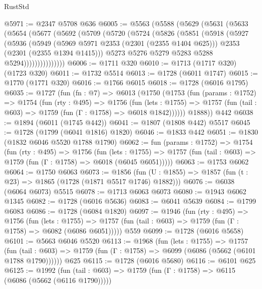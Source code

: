 \begin{lexlean}{RustStd}
\begin{coremodule}
@5971 := @2347 @5708 @636
@6005 := @5563
    (@5588
      (@5629
        (@5631
          (@5633
            (@5654
              (@5677
                (@5692
                  (@5709
                    (@5720
                      (@5724
                        (@5826
                          (@5851
                            (@5918
                              (@5927
                                (@5936
                                  (@5949
                                    (@5969 @5971 @2353 (@2301 (@2355 @1404 @625)))
                                    @2353
                                    (@2301 (@2355 @1394 @1415)))
                                  @5273
                                  @5276
                                  @5279
                                  @5283
                                  @5288
                                  @5294)))))))))))))))
@6006 := @1711 @320
@6010 := @1713 (@1717 @320) (@1723 @320)
@6011 := @1732 @5514
@6013 := @1728 (@6011 @1747)
@6015 := @1770 (@1771 @320)
@6016 := @1766 @6015
@6018 := @1728 (@6016 @1795)
@6035 := @1727
    (fun (fn : @7) =>
    @6013
      (@1750
        (@1753
          (fun (params : @1752) =>
          @1754
            (fun (rty : @495) =>
            @1756
              (fun (lets : @1755) =>
              @1757 (fun (tail : @603) => @1759 (fun (Γ : @1758) => @6018 @1842))))))
        @1888))
    @442
@6038 := @1894 (@6011 (@1745 @442))
@6041 := @1807 (@1808 @442) @5517
@6045 := @1728 (@1799 (@6041 @1816) @1820)
@6046 := @1833 @442
@6051 := @1830 (@1832 @6046 @5520 @1788 @1790)
@6062 := fun (params : @1752) =>
  @1754
    (fun (rty : @495) =>
    @1756
      (fun (lets : @1755) =>
      @1757 (fun (tail : @603) => @1759 (fun (Γ : @1758) => @6018 (@6045 @6051)))))
@6063 := @1753 @6062
@6064 := @1750 @6063
@6073 := @1856 (fun (U : @1855) => @1857 (fun (t : @23) => @1865 (@1728 (@1871 @5517 @1746) @1882)))
@6076 := @6038 (@6064 @6073) @5515
@6078 := @1713 @6063 @6073
@6080 := @1943 @6062 @1345
@6082 := @1728 (@6016 @5636)
@6083 := @6041 @5639
@6084 := @1799 @6083
@6086 := @1728 (@6084 @1820)
@6097 := @1946
    (fun (rty : @495) =>
    @1756
      (fun (lets : @1755) =>
      @1757 (fun (tail : @603) => @1759 (fun (Γ : @1758) => @6082 (@6086 @6051)))))
    @559
@6099 := @1728 (@6016 @5658)
@6101 := @5663 @6046 @5520
@6113 := @1968
    (fun (lets : @1755) =>
    @1757
      (fun (tail : @603) => @1759 (fun (Γ : @1758) => @6099 (@6086 (@5662 (@6101 @1788 @1790))))))
    @625
@6115 := @1728 (@6016 @5680)
@6116 := @6101 @625
@6125 := @1992
    (fun (tail : @603) => @1759 (fun (Γ : @1758) => @6115 (@6086 (@5662 (@6116 @1790)))))

\end{coremodule}
\end{lexlean}
